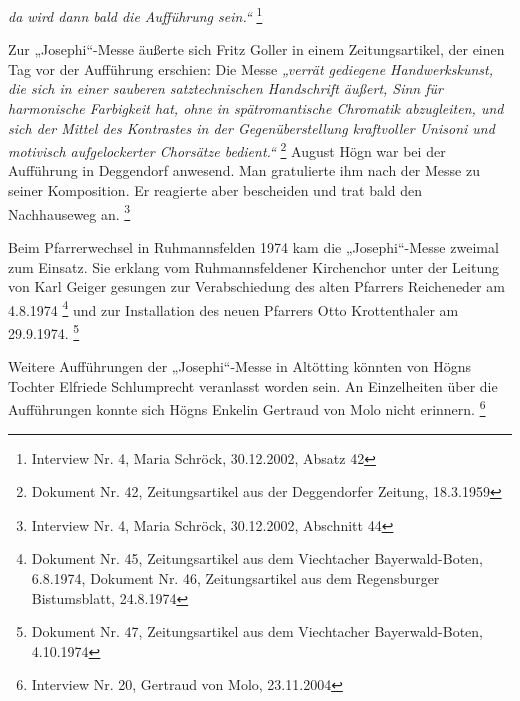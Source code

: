 \documentclass[a4paper]{article}
\newcommand\textstyleZitate[1]{\textit{#1}}
\begin{document}
\textstyleZitate{da wird dann bald die Aufführung sein.“ }\footnote{
Interview Nr. 4, Maria Schröck, 30.12.2002, Absatz 42}

Zur „Josephi“-Messe äußerte sich Fritz Goller in einem Zeitungsartikel,
der einen Tag vor der Aufführung erschien:\textstyleZitate{ }Die
Messe\textstyleZitate{ „verrät gediegene Handwerkskunst, die sich in
einer sauberen satztechnischen Handschrift äußert, Sinn für harmonische
Farbigkeit hat, ohne in spätromantische Chromatik abzugleiten, und sich
der Mittel des Kontrastes in der Gegenüberstellung kraftvoller Unisoni
und motivisch aufgelockerter Chorsätze bedient.“ } \footnote{Dokument
Nr. 42, Zeitungsartikel aus der Deggendorfer Zeitung, 18.3.1959} August
Högn war bei der Aufführung in Deggendorf anwesend. Man gratulierte ihm
nach der Messe zu seiner Komposition. Er reagierte aber bescheiden und
trat bald den Nachhauseweg an. \footnote{Interview Nr. 4, Maria
Schröck, 30.12.2002, Abschnitt 44}

Beim Pfarrerwechsel in Ruhmannsfelden 1974 kam die „Josephi“-Messe
zweimal zum Einsatz. Sie erklang vom Ruhmannsfeldener Kirchenchor unter
der Leitung von Karl Geiger gesungen zur Verabschiedung des alten
Pfarrers Reicheneder am 4.8.1974 \footnote{Dokument Nr. 45,
Zeitungsartikel aus dem Viechtacher Bayerwald-Boten, 6.8.1974, Dokument
Nr. 46, Zeitungsartikel aus dem Regensburger Bistumsblatt, 24.8.1974}
und zur Installation des neuen Pfarrers Otto Krottenthaler am
29.9.1974. \footnote{Dokument Nr. 47, Zeitungsartikel aus dem
Viechtacher Bayerwald-Boten, 4.10.1974}

Weitere Aufführungen der „Josephi“-Messe in Altötting könnten von Högns
Tochter Elfriede Schlumprecht veranlasst worden sein. An Einzelheiten
über die Aufführungen konnte sich Högns Enkelin Gertraud von Molo nicht
erinnern. \footnote{Interview Nr. 20, Gertraud von Molo, 23.11.2004}
\end{document}
